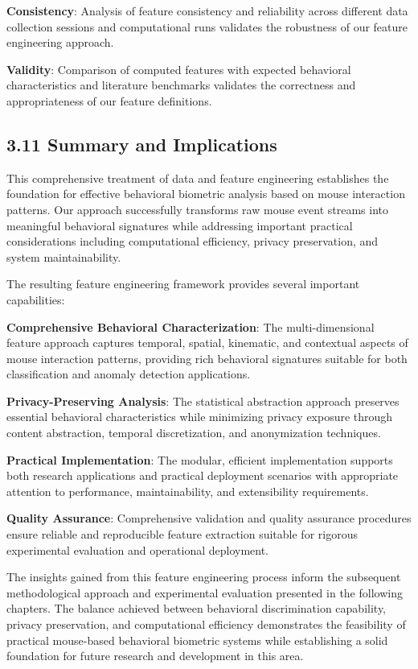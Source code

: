 \documentclass[
  11pt,
  a4paper,
]{article}
\begin{document}
\textbf{Consistency}: Analysis of feature consistency and reliability
across different data collection sessions and computational runs
validates the robustness of our feature engineering approach.

\textbf{Validity}: Comparison of computed features with expected
behavioral characteristics and literature benchmarks validates the
correctness and appropriateness of our feature definitions.

\subsection{3.11 Summary and
Implications}\label{summary-and-implications}

This comprehensive treatment of data and feature engineering establishes
the foundation for effective behavioral biometric analysis based on
mouse interaction patterns. Our approach successfully transforms raw
mouse event streams into meaningful behavioral signatures while
addressing important practical considerations including computational
efficiency, privacy preservation, and system maintainability.

The resulting feature engineering framework provides several important
capabilities:

\textbf{Comprehensive Behavioral Characterization}: The
multi-dimensional feature approach captures temporal, spatial,
kinematic, and contextual aspects of mouse interaction patterns,
providing rich behavioral signatures suitable for both classification
and anomaly detection applications.

\textbf{Privacy-Preserving Analysis}: The statistical abstraction
approach preserves essential behavioral characteristics while minimizing
privacy exposure through content abstraction, temporal discretization,
and anonymization techniques.

\textbf{Practical Implementation}: The modular, efficient implementation
supports both research applications and practical deployment scenarios
with appropriate attention to performance, maintainability, and
extensibility requirements.

\textbf{Quality Assurance}: Comprehensive validation and quality
assurance procedures ensure reliable and reproducible feature extraction
suitable for rigorous experimental evaluation and operational
deployment.

The insights gained from this feature engineering process inform the
subsequent methodological approach and experimental evaluation presented
in the following chapters. The balance achieved between behavioral
discrimination capability, privacy preservation, and computational
efficiency demonstrates the feasibility of practical mouse-based
behavioral biometric systems while establishing a solid foundation for
future research and development in this area.
\end{document}
